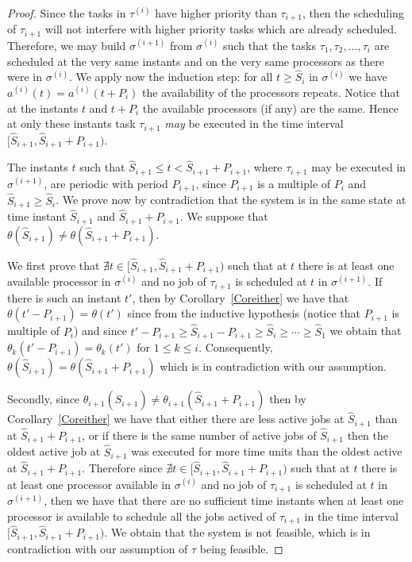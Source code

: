 \documentclass[a4paper,11pt]{article}
\begin{document}
\begin{proof}
Since the tasks in $\tau^{(i)}$ have higher priority than
$\tau_{i+1}$, then the scheduling of $\tau_{i+1}$ will not interfere
with higher priority tasks which are already scheduled. Therefore, we
may build $\sigma^{(i+1)}$ from $\sigma^{(i)}$ such that the tasks
$\tau_1, \tau_2, \ldots, \tau_i$ are scheduled at the very same
instants and on the very same processors as there were in
$\sigma^{(i)}$. We apply now the induction step: for all $t \geq
\widehat{S}_{i}$ in $\sigma^{(i)}$ we have $a^{(i)}(t) = a^{(i)}(t +P_i)$ the
availability of the processors repeats. Notice that at the instants
$t$ and $t+P_i$ the available processors (if any) are the same. Hence
at only these instants task $\tau_{i+1}$ {\em may} be executed in the
time interval $[\widehat{S}_{i+1}, \widehat{S}_{i+1}+P_{i+1})$. 

The instants $t$ such that $\widehat{S}_{i+1} \leq t < \widehat{S}_{i+1}+P_{i+1}$, where
$\tau_{i+1}$ may be executed in $\sigma^{(i+1)}$, are periodic with
period $P_{i+1}$, since $P_{i+1}$ is a multiple of $P_i$ and $\widehat{S}_{i+1}
\geq \widehat{S}_i$. We prove now by contradiction that the system is in the
same state at time instant $\widehat{S}_{i+1}$ and $\widehat{S}_{i+1}+P_{i+1}$. We suppose that  $\theta(\widehat{S}_{i+1}) \neq \theta(\widehat{S}_{i+1}+P_{i+1})$.

We first prove that $ \nexists t \in [\widehat{S}_{i+1}, \widehat{S}_{i+1}+P_{i+1})$ such
that at $t$ there is at least one available processor in
$\sigma^{(i)}$ and no job of $\tau_{i+1}$ is scheduled at $t$ in
$\sigma^{(i+1)}$. If there is such an instant $t'$, then by
Corollary~\ref{Coreither} we have that $\theta(t'-P_{i+1})=
\theta(t')$ since from the inductive hypothesis (notice that
$P_{i+1}$ is multiple of $P_i$) and since $t'-P_{i+1} \geq \widehat{S}_{i+1}-P_{i+1}
\geq \widehat{S}_{i} \geq \cdots \geq \widehat{S}_1$ we obtain that
$\theta_k(t'-P_{i+1})=\theta_k(t')$ for $1 \leq k \leq
i$. Consequently, $\theta(\widehat{S}_{i+1})= \theta(\widehat{S}_{i+1}+P_{i+1})$ which is
in contradiction with our assumption.

Secondly, since $\theta_{i+1}(\widehat{S}_{i+1}) \neq
\theta_{i+1}(\widehat{S}_{i+1}+P_{i+1})$ then by Corollary~\ref{Coreither} we
have that either there are less active jobs at $\widehat{S}_{i+1}$ than at
$\widehat{S}_{i+1}+P_{i+1}$, or if there is the same number of active jobs of
$\widehat{S}_{i+1}$ then the oldest active job at $\widehat{S}_{i+1}$ was executed for
more time units than the oldest active at $\widehat{S}_{i+1}+P_{i+1}$. Therefore
since $\nexists t \in [\widehat{S}_{i+1}, \widehat{S}_{i+1}+P_{i+1})$ such that at $t$
there is at least one processor available in $\sigma^{(i)}$ and no job
of $\tau_{i+1}$ is scheduled at $t$ in $\sigma^{(i+1)}$, then we have
that there are no sufficient time instants when at least one processor
is available to schedule all the jobs actived of $\tau_{i+1}$ in the
time interval $[\widehat{S}_{i+1}, \widehat{S}_{i+1}+P_{i+1})$. We obtain that the system
is not feasible, which is in contradiction with our assumption of
$\tau$ being feasible.


\end{proof}
\end{document}
